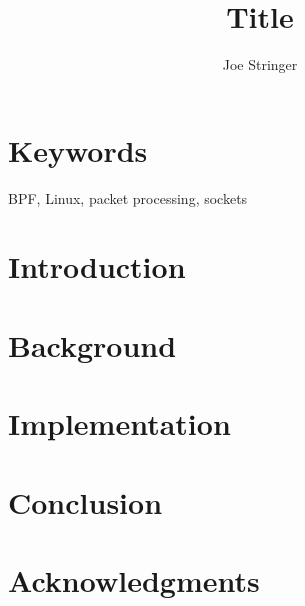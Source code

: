 \documentclass[10pt,sigconf,authorversion]{lpc}
\title{Title}
\author{Joe Stringer}
\affiliation{%
      \institution{Cilium.io}}
\begin{document}
\begin{abstract}

\end{abstract}

\maketitle

\section{Keywords}

BPF, Linux, packet processing, sockets

\section{Introduction}

\section{Background}

\section{Implementation}

\section{Conclusion}

\section{Acknowledgments}



\end{document}
